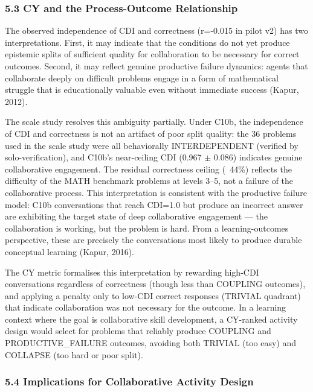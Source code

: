 \documentclass[
  11pt,
]{article}
\begin{document}
\subsubsection{5.3 CY and the Process-Outcome
Relationship}\label{cy-and-the-process-outcome-relationship}

The observed independence of CDI and correctness (r=-0.015 in pilot v2)
has two interpretations. First, it may indicate that the conditions do
not yet produce epistemic splits of sufficient quality for collaboration
to be necessary for correct outcomes. Second, it may reflect genuine
productive failure dynamics: agents that collaborate deeply on difficult
problems engage in a form of mathematical struggle that is educationally
valuable even without immediate success (Kapur, 2012).

The scale study resolves this ambiguity partially. Under C10b, the independence of CDI and correctness is not an artifact of poor split quality: the 36 problems used in the scale study were all behaviorally INTERDEPENDENT (verified by solo-verification), and C10b's near-ceiling CDI (0.967 $\pm$ 0.086) indicates genuine collaborative engagement. The residual correctness ceiling (~44\%) reflects the difficulty of the MATH benchmark problems at levels 3--5, not a failure of the collaborative process. This interpretation is consistent with the productive failure model: C10b conversations that reach CDI=1.0 but produce an incorrect answer are exhibiting the target state of deep collaborative engagement --- the collaboration is working, but the problem is hard. From a learning-outcomes perspective, these are precisely the conversations most likely to produce durable conceptual learning (Kapur, 2016).

The CY metric formalises this interpretation by rewarding high-CDI conversations regardless of correctness (though less than COUPLING outcomes), and applying a penalty only to low-CDI correct responses (TRIVIAL quadrant) that indicate collaboration was not necessary for the outcome. In a learning context where the goal is collaborative skill development, a CY-ranked activity design would select for problems that reliably produce COUPLING and PRODUCTIVE\_FAILURE outcomes, avoiding both TRIVIAL (too easy) and COLLAPSE (too hard or poor split).

\subsubsection{5.4 Implications for Collaborative Activity
Design}\label{implications-for-collaborative-activity-design}
\end{document}
